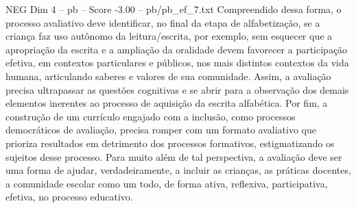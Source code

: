 \begin{textsample}{NEG Dim 4 – pb – Score -3.00 – pb/pb\_ef\_7.txt}
Compreendido dessa forma, o processo avaliativo deve identificar, no final da etapa de alfabetização, se a criança faz uso autônomo da leitura/escrita, por exemplo, sem esquecer que a apropriação da escrita e a ampliação da oralidade devem favorecer a participação efetiva, em contextos particulares e públicos, nos mais distintos contextos da vida humana, articulando saberes e valores de sua comunidade.
Assim, a avaliação precisa ultrapassar as questões cognitivas e se abrir para a observação dos demais elementos inerentes ao processo de aquisição da escrita alfabética.
Por fim, a construção de um currículo engajado com a inclusão, como processos democráticos de avaliação, precisa romper com um formato avaliativo que prioriza resultados em detrimento dos processos formativos, estigmatizando os sujeitos desse processo.
Para muito além de tal perspectiva, a avaliação deve ser uma forma de ajudar, verdadeiramente, a incluir as crianças, as práticas docentes, a comunidade escolar como um todo, de forma ativa, reflexiva, participativa, efetiva, no processo educativo.

\end{textsample}
